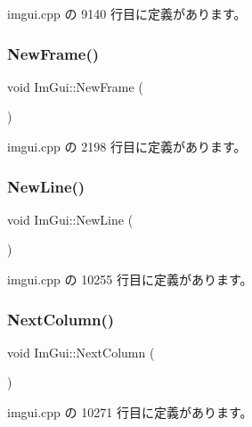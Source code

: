  imgui.\+cpp の 9140 行目に定義があります。

\mbox{\label{namespace_im_gui_ab3f1fc018f903b7ad79fd10663375774}} 
\subsubsection{\texorpdfstring{New\+Frame()}{NewFrame()}}
{\footnotesize\ttfamily void Im\+Gui\+::\+New\+Frame (\begin{DoxyParamCaption}{ }\end{DoxyParamCaption})}



 imgui.\+cpp の 2198 行目に定義があります。

\mbox{\label{namespace_im_gui_a77f8b0a33e5335f98661f99e720411da}} 
\subsubsection{\texorpdfstring{New\+Line()}{NewLine()}}
{\footnotesize\ttfamily void Im\+Gui\+::\+New\+Line (\begin{DoxyParamCaption}{ }\end{DoxyParamCaption})}



 imgui.\+cpp の 10255 行目に定義があります。

\mbox{\label{namespace_im_gui_a8f97746d6a9d59c8400c26fb7613a2ff}} 
\subsubsection{\texorpdfstring{Next\+Column()}{NextColumn()}}
{\footnotesize\ttfamily void Im\+Gui\+::\+Next\+Column (\begin{DoxyParamCaption}{ }\end{DoxyParamCaption})}



 imgui.\+cpp の 10271 行目に定義があります。

\mbox{\label{namespace_im_gui_a9576648c40b92f54b671e2e51654dd2c}} 
